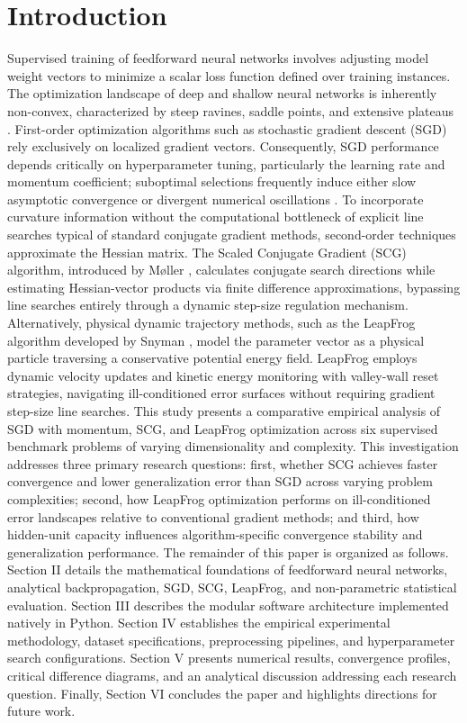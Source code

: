 \documentclass[10pt, conference]{IEEEtran}
\begin{document}
\section{Introduction}

Supervised training of feedforward neural networks involves adjusting model weight vectors to minimize a scalar loss function defined over training instances. The optimization landscape of deep and shallow neural networks is inherently non-convex, characterized by steep ravines, saddle points, and extensive plateaus \cite{moller1993scaled}. First-order optimization algorithms such as stochastic gradient descent (SGD) rely exclusively on localized gradient vectors. Consequently, SGD performance depends critically on hyperparameter tuning, particularly the learning rate and momentum coefficient; suboptimal selections frequently induce either slow asymptotic convergence or divergent numerical oscillations \cite{snyman1982improved}.
To incorporate curvature information without the computational bottleneck of explicit line searches typical of standard conjugate gradient methods, second-order techniques approximate the Hessian matrix. The Scaled Conjugate Gradient (SCG) algorithm, introduced by Møller \cite{moller1993scaled}, calculates conjugate search directions while estimating Hessian-vector products via finite difference approximations, bypassing line searches entirely through a dynamic step-size regulation mechanism. Alternatively, physical dynamic trajectory methods, such as the LeapFrog algorithm developed by Snyman \cite{snyman1982improved, snyman1983practical}, model the parameter vector as a physical particle traversing a conservative potential energy field. LeapFrog employs dynamic velocity updates and kinetic energy monitoring with valley-wall reset strategies, navigating ill-conditioned error surfaces without requiring gradient step-size line searches.
This study presents a comparative empirical analysis of SGD with momentum, SCG, and LeapFrog optimization across six supervised benchmark problems of varying dimensionality and complexity. This investigation addresses three primary research questions: first, whether SCG achieves faster convergence and lower generalization error than SGD across varying problem complexities; second, how LeapFrog optimization performs on ill-conditioned error landscapes relative to conventional gradient methods; and third, how hidden-unit capacity influences algorithm-specific convergence stability and generalization performance.
The remainder of this paper is organized as follows. Section II details the mathematical foundations of feedforward neural networks, analytical backpropagation, SGD, SCG, LeapFrog, and non-parametric statistical evaluation. Section III describes the modular software architecture implemented natively in Python. Section IV establishes the empirical experimental methodology, dataset specifications, preprocessing pipelines, and hyperparameter search configurations. Section V presents numerical results, convergence profiles, critical difference diagrams, and an analytical discussion addressing each research question. Finally, Section VI concludes the paper and highlights directions for future work.
\end{document}
